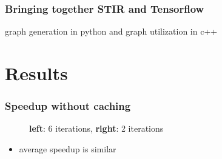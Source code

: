 \documentclass{beamer}
\begin{document}
\begin{frame}
  \frametitle{Bringing together STIR and Tensorflow}
  graph generation in python and graph utilization in c++
\end{frame}

\section{Results}
\begin{frame}
  \frametitle{Speedup without caching}
  \begin{figure}
    \centering
      \caption{\textbf{left}: 6 iterations, \textbf{right}: 2 iterations}
  \end{figure}
  
  \begin{itemize}
    \item average speedup is similar
  \end{itemize}
\end{frame}
\end{document}
